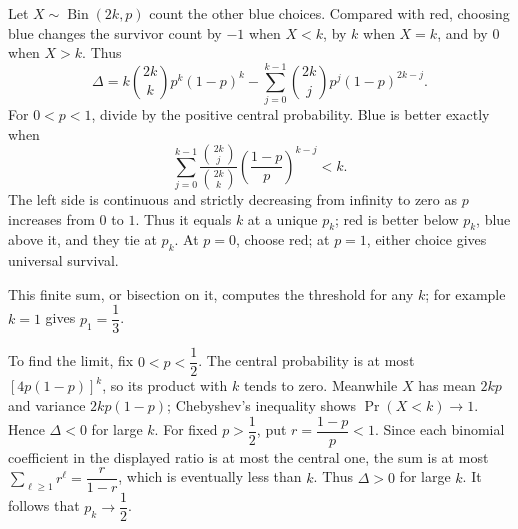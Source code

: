 Let $X\sim\operatorname{Bin}(2k,p)$ count the other blue choices. Compared with red, choosing blue changes the survivor count by $-1$ when $X<k$, by $k$ when $X=k$, and by $0$ when $X>k$. Thus
\[
\Delta=k\binom{2k}{k}p^k(1-p)^k-\sum_{j=0}^{k-1}\binom{2k}{j}p^j(1-p)^{2k-j}.
\]
For $0<p<1$, divide by the positive central probability. Blue is better exactly when
\[
\boxed{\sum_{j=0}^{k-1}\dfrac{\binom{2k}{j}}{\binom{2k}{k}}
\left(\dfrac{1-p}{p}\right)^{k-j}<k.}
\]
The left side is continuous and strictly decreasing from infinity to zero as $p$ increases from $0$ to $1$. Thus it equals $k$ at a unique $p_k$; red is better below $p_k$, blue above it, and they tie at $p_k$. At $p=0$, choose red; at $p=1$, either choice gives universal survival.

This finite sum, or bisection on it, computes the threshold for any $k$; for example $k=1$ gives $p_1=\dfrac{1}{3}$.

To find the limit, fix $0<p<\dfrac{1}{2}$. The central probability is at most $[4p(1-p)]^k$, so its product with $k$ tends to zero. Meanwhile $X$ has mean $2kp$ and variance $2kp(1-p)$; Chebyshev's inequality shows $\Pr(X<k)\to1$. Hence $\Delta<0$ for large $k$.
For fixed $p>\dfrac{1}{2}$, put $r=\dfrac{1-p}{p}<1$. Since each binomial coefficient in the displayed ratio is at most the central one, the sum is at most $\sum_{\ell\ge1}r^\ell=\dfrac{r}{1-r}$, which is eventually less than $k$. Thus $\Delta>0$ for large $k$. It follows that $\boxed{p_k\to\dfrac{1}{2}}$.
